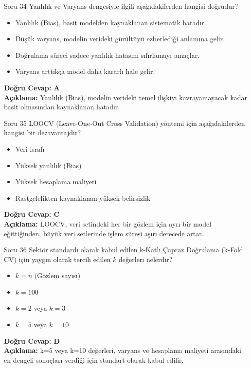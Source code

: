 \documentclass[12pt,a4paper]{article}
\begin{document}
\begin{testcard}{Soru 34}
    Yanlılık ve Varyans dengesiyle ilgili aşağıdakilerden hangisi doğrudur?
    \begin{itemize}
        \item[A)] Yanlılık (Bias), basit modelden kaynaklanan sistematik hatadır.
        \item[B)] Düşük varyans, modelin verideki gürültüyü ezberlediği anlamına gelir.
        \item[C)] Doğrulama süreci sadece yanlılık hatasını sıfırlamayı amaçlar.
        \item[D)] Varyans arttıkça model daha kararlı hale gelir.
    \end{itemize}
    \tcblower
    \textbf{Doğru Cevap: A} \\
    \textbf{Açıklama:} Yanlılık (Bias), modelin verideki temel ilişkiyi kavrayamayacak kadar basit olmasından kaynaklanan hatadır.
\end{testcard}

\begin{testcard}{Soru 35}
    LOOCV (Leave-One-Out Cross Validation) yöntemi için aşağıdakilerden hangisi bir dezavantajdır?
    \begin{itemize}
        \item[A)] Veri israfı
        \item[B)] Yüksek yanlılık (Bias)
        \item[C)] Yüksek hesaplama maliyeti
        \item[D)] Rastgelelikten kaynaklanan yüksek belirsizlik
    \end{itemize}
    \tcblower
    \textbf{Doğru Cevap: C} \\
    \textbf{Açıklama:} LOOCV, veri setindeki her bir gözlem için ayrı bir model eğittiğinden, büyük veri setlerinde işlem süresi aşırı derecede artar.
\end{testcard}

\begin{testcard}{Soru 36}
    Sektör standardı olarak kabul edilen k-Katlı Çapraz Doğrulama (k-Fold CV) için yaygın olarak tercih edilen $k$ değerleri nelerdir?
    \begin{itemize}
        \item[A)] $k = n$ (Gözlem sayısı)
        \item[B)] $k = 100$
        \item[C)] $k = 2$ veya $k = 3$
        \item[D)] $k = 5$ veya $k = 10$
    \end{itemize}
    \tcblower
    \textbf{Doğru Cevap: D} \\
    \textbf{Açıklama:} k=5 veya k=10 değerleri, varyans ve hesaplama maliyeti arasındaki en dengeli sonuçları verdiği için standart olarak kabul edilir.
\end{testcard}
\end{document}

